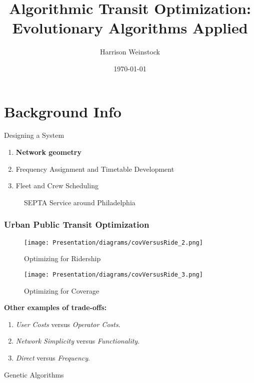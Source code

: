 \documentclass{beamer}
\title{Algorithmic Transit Optimization: Evolutionary Algorithms Applied}
\author{Harrison Weinstock}
\institute{Haverford College}
\date{\today}
\begin{document}
\frame{\titlepage}

\section{Background Info}
\begin{frame}{Designing a System}

  \begin{enumerate}
    \item \textbf{Network geometry}
    \item Frequency Assignment and Timetable Development
    \item Fleet and Crew Scheduling
    \end{enumerate}
\endminipage\hfill
{}%
\begin{figure}
  \caption{SEPTA Service around Philadelphia \cite{SEPTA}}
\end{figure}
\endminipage
\end{frame}

\begin{frame}
\frametitle{Urban Public Transit Optimization}
\begin{figure}[!htb]
  \texttt{[image: Presentation/diagrams/covVersusRide\_2.png]}
  \caption{Optimizing for Ridership \cite{walker2012}}\label{fig:ridership}
\endminipage\hfill
{}%
  \texttt{[image: Presentation/diagrams/covVersusRide\_3.png]}
  \caption{Optimizing for Coverage \cite{walker2012}}\label{fig:coverage}
\endminipage
\end{figure}
\textbf{Other examples of trade-offs:}
\begin{enumerate}
    \item \textit{User Costs} versus \textit{Operator Costs}.  
    \item \textit{Network Simplicity} versus \textit{Functionality}. 
    \item \textit{Direct} versus \textit{Frequency}. 
\end{enumerate}
\end{frame}

\begin{frame}{Genetic Algorithms}
    \begin{center}
    \end{center}
\end{frame}
\end{document}

